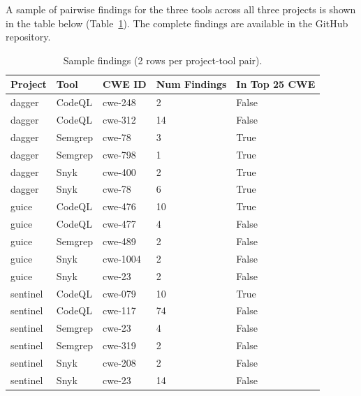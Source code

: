 A sample of pairwise findings for the three tools across all three projects is
shown in the table below (Table~\ref{table:findings}). The complete findings
are available in the GitHub repository.

\begin{table}[!ht]
    \centering
    \begin{tabular}{lllll}
        \hline
        Project  & Tool    & CWE ID   & Num Findings & In Top 25 CWE \\
        \hline
        dagger   & CodeQL  & cwe-248  & 2            & False         \\
        dagger   & CodeQL  & cwe-312  & 14           & False         \\
        dagger   & Semgrep & cwe-78   & 3            & True          \\
        dagger   & Semgrep & cwe-798  & 1            & True          \\
        dagger   & Snyk    & cwe-400  & 2            & True          \\
        dagger   & Snyk    & cwe-78   & 6            & True          \\
        guice    & CodeQL  & cwe-476  & 10           & True          \\
        guice    & CodeQL  & cwe-477  & 4            & False         \\
        guice    & Semgrep & cwe-489  & 2            & False         \\
        guice    & Snyk    & cwe-1004 & 2            & False         \\
        guice    & Snyk    & cwe-23   & 2            & False         \\
        sentinel & CodeQL  & cwe-079  & 10           & True          \\
        sentinel & CodeQL  & cwe-117  & 74           & False         \\
        sentinel & Semgrep & cwe-23   & 4            & False         \\
        sentinel & Semgrep & cwe-319  & 2            & False         \\
        sentinel & Snyk    & cwe-208  & 2            & False         \\
        sentinel & Snyk    & cwe-23   & 14           & False         \\
        \hline
    \end{tabular}
    \caption{Sample findings (2 rows per project-tool pair).}
    \label{table:findings}
\end{table}

